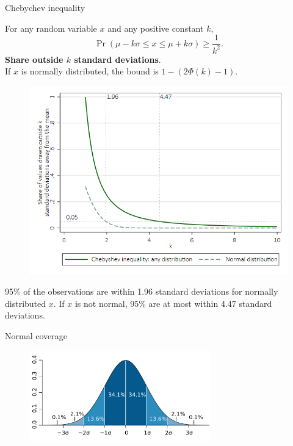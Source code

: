 \documentclass[11pt,table]{beamer}
\begin{document}
\begin{frame}{Chebychev inequality}

For any random variable $x$ and any positive constant $k$,
$$\Pr(\mu - k\sigma \leq x \leq \mu + k\sigma) \geq \frac{1}{k^{2}}.$$
\footnotesize
\textbf{Share outside $k$ standard deviations}.\\
If $x$ is normally distributed, the bound is $1-(2\Phi(k)-1)$.
\begin{figure}[H]
\begin{center}
{\includegraphics[height=0.55\textheight]{figures/chebyshev_inequality_pdf}}\label{chebyshev_inequality_pdf}
\end{center}
\end{figure}
95\% of the observations are within 1.96 standard deviations for normally distributed $x$. If $x$ is not normal, 95\% are at most within 4.47 standard deviations.

\end{frame}


\begin{frame}{Normal coverage}
\begin{figure}
	\centering
		\includegraphics[width=0.70\textwidth]{figures/Standard_deviation_diagram.png}
	\label{fig:Standard_deviation_diagram}
\end{figure}

\end{frame}
\end{document}

